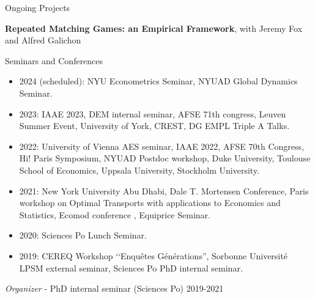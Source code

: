 \documentclass{resume} %
\begin{document}
\begin{rSection}{Ongoing Projects}

{\bf Repeated Matching Games: an Empirical Framework}, with Jeremy Fox and Alfred Galichon


\end{rSection}


\begin{rSection}{Seminars and Conferences}
\begin{itemize}
  \item 2024 (scheduled): NYU Econometrics Seminar, NYUAD Global Dynamics Seminar. 
  \item 2023: IAAE 2023, DEM internal seminar, AFSE 71th congress, Leuven Summer Event, University of York, CREST, DG EMPL Triple A Talks.
  \item 2022: University of Vienna AES seminar, IAAE 2022, AFSE 70th Congress, Hi! Paris Symposium, NYUAD Postdoc workshop, Duke University, Toulouse School of Economics, Uppsala University, Stockholm University.
  \item 2021: New York University Abu Dhabi, Dale T. Mortensen Conference, Paris workshop on Optimal Transports with applications to Economics and Statistics, Ecomod conference , Equiprice Seminar.
  \item 2020: Sciences Po Lunch Seminar.
  \item 2019: CEREQ Workshop ‘‘Enquêtes Générations'', Sorbonne Université LPSM external seminar, Sciences Po PhD internal seminar.
\end{itemize}

{\em Organizer} - PhD internal seminar (Sciences Po) \hfill {2019-2021}

\end{rSection}
\end{document}
